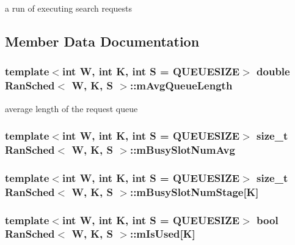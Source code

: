 a run of executing search requests 



\subsection{Member Data Documentation}
\hypertarget{classRanSched_a7e8a77245e7cd58fd16c192a89bd5e89}{
\subsubsection[{m\-Avg\-Queue\-Length}]{\setlength{\rightskip}{0pt plus 5cm}template$<$int W, int K, int S = Q\-U\-E\-U\-E\-S\-I\-Z\-E$>$ double {\bf Ran\-Sched}$<$ {\bf W}, K, S $>$\-::m\-Avg\-Queue\-Length\hspace{0.3cm}{\ttfamily [private]}}}\label{classRanSched_a7e8a77245e7cd58fd16c192a89bd5e89}


average length of the request queue 

\hypertarget{classRanSched_adf97c2280f441eee70c102bae65ef4b6}{
\subsubsection[{m\-Busy\-Slot\-Num\-Avg}]{\setlength{\rightskip}{0pt plus 5cm}template$<$int W, int K, int S = Q\-U\-E\-U\-E\-S\-I\-Z\-E$>$ size\-\_\-t {\bf Ran\-Sched}$<$ {\bf W}, K, S $>$\-::m\-Busy\-Slot\-Num\-Avg\hspace{0.3cm}{\ttfamily [private]}}}\label{classRanSched_adf97c2280f441eee70c102bae65ef4b6}
\hypertarget{classRanSched_a80d8fc5fae90473bba4343b3daa7eb77}{
\subsubsection[{m\-Busy\-Slot\-Num\-Stage}]{\setlength{\rightskip}{0pt plus 5cm}template$<$int W, int K, int S = Q\-U\-E\-U\-E\-S\-I\-Z\-E$>$ size\-\_\-t {\bf Ran\-Sched}$<$ {\bf W}, K, S $>$\-::m\-Busy\-Slot\-Num\-Stage\mbox{[}K\mbox{]}\hspace{0.3cm}{\ttfamily [private]}}}\label{classRanSched_a80d8fc5fae90473bba4343b3daa7eb77}
\hypertarget{classRanSched_a2919a4a797f648a0d21c1c24132a4c90}{
\subsubsection[{m\-Is\-Used}]{\setlength{\rightskip}{0pt plus 5cm}template$<$int W, int K, int S = Q\-U\-E\-U\-E\-S\-I\-Z\-E$>$ bool {\bf Ran\-Sched}$<$ {\bf W}, K, S $>$\-::m\-Is\-Used\mbox{[}K\mbox{]}\hspace{0.3cm}{\ttfamily [private]}}}\label{classRanSched_a2919a4a797f648a0d21c1c24132a4c90}


